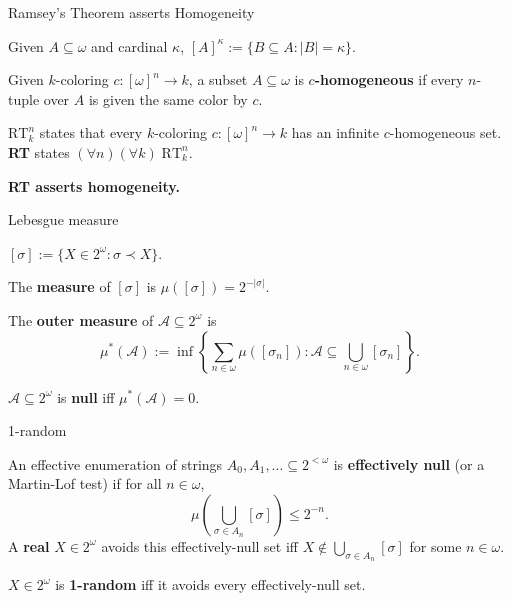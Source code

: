 \begin{frame}{Ramsey's Theorem asserts Homogeneity}
  \begin{notation*}
    Given $A\subseteq\omega$ and cardinal $\kappa$,
    $[A]^\kappa :=\{B\subseteq A:|B|=\kappa\}$.
  \end{notation*}

  \begin{define*}[$c$-homogeneous]
    Given $k$-coloring $c:[\omega]^n\rightarrow k$, a subset
    $A\subseteq\omega$ is \textbf{$c$-homogeneous} if every $n$-tuple over
    $A$ is given the same color by $c$.
  \end{define*}

  \begin{thm*}[Ramsey's]
    \textbf{$\text{RT}_k^n$} states that every $k$-coloring
    $c:[\omega]^n\rightarrow k$ has an infinite $c$-homogeneous set.
    \textbf{RT} states $(\forall n)(\forall k)\; \text{RT}_k^n$.
  \end{thm*}

  \vspace{0.5em}
  \textbf{RT asserts homogeneity.}
\end{frame}

\begin{frame}{Lebesgue measure}
  \begin{notation*}
    $[\sigma] :=\{X\in2^\omega: \sigma\prec X\}$.
  \end{notation*}

  \begin{define*}
    The \textbf{measure} of $[\sigma]$ is $\mu([\sigma]) =2^{-|\sigma|}$.
  \end{define*}

  \begin{define*}
    The \textbf{outer measure} of $\mathcal{A}\subseteq2^\omega$ is
    \[\mu^*(\mathcal{A}):= \inf\left\{\sum_{n\in\omega}
    \mu([\sigma_n]): \mathcal{A}\subseteq
    \bigcup_{n\in\omega} [\sigma_n]\right\}.\]
  \end{define*}

  \begin{define*}
    $\mathcal{A}\subseteq2^\omega$ is \textbf{null} iff
    $\mu^*(\mathcal{A})=0$.
  \end{define*}
\end{frame}

\begin{frame}{1-random}
  \begin{define*}
    An effective enumeration of strings
    $A_0,A_1,\ldots \subseteq 2^{<\omega}$ is \textbf{effectively null} (or a
    Martin-Lof test) if for all $n\in\omega$,
    \[\mu\left(\bigcup_{\sigma \in A_n} [\sigma] \right) \leq 2^{-n}.\]
    A \textbf{real} $X\in2^\omega$ avoids this effectively-null set iff
    $X\not\in \bigcup_{\sigma \in A_n} [\sigma]$ for some $n\in\omega$.
  \end{define*}

  \begin{define*}
    $X\in2^\omega$ is \textbf{1-random} iff it avoids every
    effectively-null set.
  \end{define*}
\end{frame}

